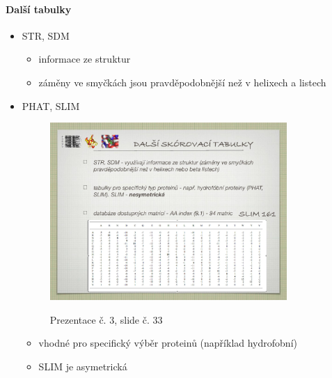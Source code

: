 \documentclass[DIV=8]{scrreprt}
\begin{document}
\paragraph{Další tabulky}
\begin{itemize}[nosep]
    \item STR, SDM
\begin{itemize}[nosep]
    \item informace ze struktur
    \item záměny ve smyčkách jsou pravděpodobnější než v helixech a listech
\end{itemize}

    \item PHAT, SLIM \begin{figure}
    \caption{Prezentace č. 3, slide č. 33}
    \includegraphics[width=0.85\textwidth]{slides-3/slide-33.jpg}
    \centering
    \label{slides-3-slide-33}
\end{figure}

\begin{itemize}[nosep]
    \item vhodné pro specifický výběr proteinů (například hydrofobní)
    \item SLIM je asymetrická
\end{itemize}

\end{itemize}
\end{document}
